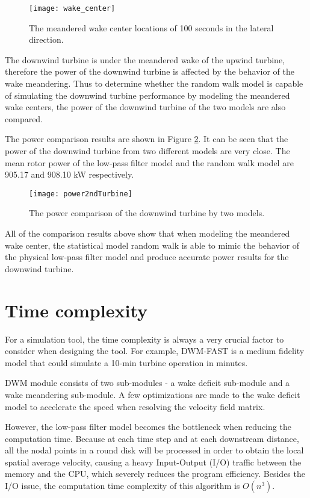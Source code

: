 \documentclass{umthesis}
\begin{document}
\begin{figure}
  \centering
  \texttt{[image: wake\_center]}
  \caption{The meandered wake center locations of 100 seconds in the lateral direction.}\label{fig:wake_center_compare}
\end{figure}

The downwind turbine is under the meandered wake of the upwind turbine, therefore the power of the downwind turbine is affected by the behavior of the wake meandering. Thus to determine whether the random walk model is capable of simulating the downwind turbine performance by modeling the meandered wake centers, the power of the downwind turbine of the two models are also compared. 

The power comparison results are shown in Figure \ref{fig:rw_power_compare}. It can be seen that the power of the downwind turbine from two different models are very close. The mean rotor power of the low-pass filter model and the random walk model are 905.17 and 908.10 kW respectively.

\begin{figure}
  \centering
  \texttt{[image: power2ndTurbine]}
  \caption{The power comparison of the downwind turbine by two models.}\label{fig:rw_power_compare}
\end{figure}

All of the comparison results above show that when modeling the meandered wake center, the statistical model random walk is able to mimic the behavior of the physical low-pass filter model and produce accurate power results for the downwind turbine.

\section{Time complexity}\label{sec:timeComplexity}
For a simulation tool, the time complexity is always a very crucial factor to consider when designing the tool. For example, DWM-FAST is a medium fidelity model that could simulate a 10-min turbine operation in minutes.

DWM module consists of two sub-modules - a wake deficit sub-module and a wake meandering sub-module. A few optimizations are made to the wake deficit model to accelerate the speed when resolving the velocity field matrix. 

However, the low-pass filter model becomes the bottleneck when reducing the computation time. Because at each time step and at each downstream distance, all the nodal points in a round disk will be processed in order to obtain the local spatial average velocity, causing a heavy Input-Output (I/O) traffic between the memory and the CPU, which severely reduces the program efficiency. Besides the I/O issue, the computation time complexity of this algorithm is $O(n^3)$.
\end{document}
